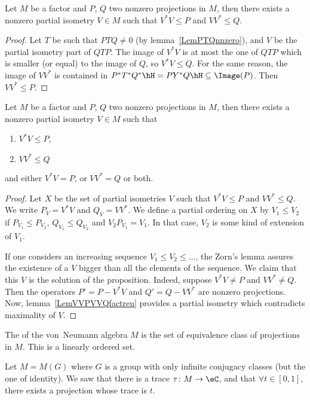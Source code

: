 \begin{lemma}		\label{LemVVPVVQfactreu}
	Let $M$ be a factor and $P$, $Q$ two nonzero projections in $M$, then there exists a nonzero partial isometry $V\in M$ such that $V^*V\leq P$ and $VV^*\leq Q$.
\end{lemma}

\begin{proof}
	Let $T$ be such that $PTQ\neq 0$ (by lemma~\ref{LemPTQnnzero}), and $V$ be the partial isometry part of $QTP$. The image of $V^*V$ is at most the one of $QTP$ which is smaller (or equal) to the image of $Q$, so $V^*V\leq Q$. For the same reason, the image of $VV^*$ is contained in $P^*T^*Q^*\hH=PY^*Q\hH\subseteq\Image(P)$. Then $VV^*\leq P$.
\end{proof}

\begin{proposition}
	Let $M$ be a factor and $P$, $Q$ two nonzero projections in $M$, then there exists a nonzero partial isometry $V\in M$ such that
	\begin{enumerate}
		\item $V^*V\leq P$,
		\item $VV^*\leq Q$
	\end{enumerate}
	and either $V^*V=P$, or $VV^*=Q$ or both.
\end{proposition}

\begin{proof}
	Let $X$ be the set of partial isometries $V$ such that $V^*V\leq P$ and $VV^*\leq Q$. We write $P_V=V^*V$ and $Q_V=VV^*$. We define a partial ordering on $X$ by $V_1\leq V_2$ if $P_{V_1}\leq P_{V_2}$, $Q_{V_1}\leq Q_{V_2}$ and $V_2P_{V_1}=V_1$. In that case, $V_2$ is some kind of extension of $V_1$.

	If one considers an increasing sequence $V_1\leq V_2\leq\ldots$, the Zorn's lemma assures the existence of a $V$ bigger than all the elements of the sequence. We claim that this $V$ is the solution of the proposition. Indeed, suppose $V^*V\neq P$ and $VV^*\neq Q$. Then the operators $P'=P-V^*V$ and $Q'=Q-VV^*$ are nonzero projections. Now, lemma~\ref{LemVVPVVQfactreu} provides a partial isometry which contradicts maximality of $V$.
\end{proof}

The  of the von~Neumann algebra $M$ is the set of equivalence class of projections in $M$. This is a linearly ordered set.

Let $M=M(G)$ where $G$ is a group with only infinite conjugacy classes (but the one of identity). We saw that there is a trace $\tau\colon M\to \eC$, and that $\forall t\in[0,1]$, there exists a projection whose trace is $t$.

